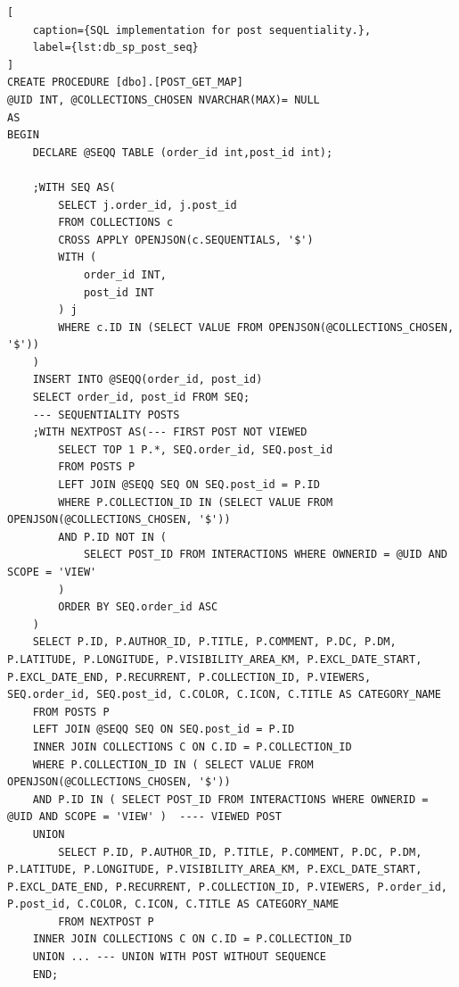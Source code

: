 \begin{lstlisting}[
    caption={SQL implementation for post sequentiality.},
    label={lst:db_sp_post_seq}
]
CREATE PROCEDURE [dbo].[POST_GET_MAP]
@UID INT, @COLLECTIONS_CHOSEN NVARCHAR(MAX)= NULL
AS
BEGIN
    DECLARE @SEQQ TABLE (order_id int,post_id int);

    ;WITH SEQ AS(
        SELECT j.order_id, j.post_id
        FROM COLLECTIONS c
        CROSS APPLY OPENJSON(c.SEQUENTIALS, '$')
        WITH (
            order_id INT,
            post_id INT
        ) j
        WHERE c.ID IN (SELECT VALUE FROM OPENJSON(@COLLECTIONS_CHOSEN, '$'))
    )
    INSERT INTO @SEQQ(order_id, post_id) 
    SELECT order_id, post_id FROM SEQ;
    --- SEQUENTIALITY POSTS
    ;WITH NEXTPOST AS(--- FIRST POST NOT VIEWED
        SELECT TOP 1 P.*, SEQ.order_id, SEQ.post_id
        FROM POSTS P
        LEFT JOIN @SEQQ SEQ ON SEQ.post_id = P.ID
        WHERE P.COLLECTION_ID IN (SELECT VALUE FROM OPENJSON(@COLLECTIONS_CHOSEN, '$'))
        AND P.ID NOT IN (
            SELECT POST_ID FROM INTERACTIONS WHERE OWNERID = @UID AND SCOPE = 'VIEW'
        )
        ORDER BY SEQ.order_id ASC
    )
    SELECT P.ID, P.AUTHOR_ID, P.TITLE, P.COMMENT, P.DC, P.DM, P.LATITUDE, P.LONGITUDE, P.VISIBILITY_AREA_KM, P.EXCL_DATE_START, P.EXCL_DATE_END, P.RECURRENT, P.COLLECTION_ID, P.VIEWERS, SEQ.order_id, SEQ.post_id, C.COLOR, C.ICON, C.TITLE AS CATEGORY_NAME
    FROM POSTS P
    LEFT JOIN @SEQQ SEQ ON SEQ.post_id = P.ID
    INNER JOIN COLLECTIONS C ON C.ID = P.COLLECTION_ID
    WHERE P.COLLECTION_ID IN ( SELECT VALUE FROM OPENJSON(@COLLECTIONS_CHOSEN, '$'))
    AND P.ID IN ( SELECT POST_ID FROM INTERACTIONS WHERE OWNERID = @UID AND SCOPE = 'VIEW' )  ---- VIEWED POST 
    UNION
        SELECT P.ID, P.AUTHOR_ID, P.TITLE, P.COMMENT, P.DC, P.DM, P.LATITUDE, P.LONGITUDE, P.VISIBILITY_AREA_KM, P.EXCL_DATE_START, P.EXCL_DATE_END, P.RECURRENT, P.COLLECTION_ID, P.VIEWERS, P.order_id, P.post_id, C.COLOR, C.ICON, C.TITLE AS CATEGORY_NAME
        FROM NEXTPOST P
    INNER JOIN COLLECTIONS C ON C.ID = P.COLLECTION_ID
    UNION ... --- UNION WITH POST WITHOUT SEQUENCE
    END;
\end{lstlisting}
